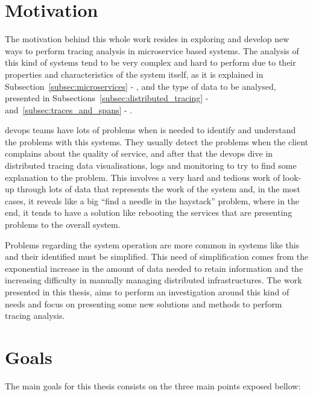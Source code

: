 \section{Motivation}
\label{sec:motivation}

The motivation behind this whole work resides in exploring and develop new ways to perform tracing analysis in microservice based systems. The analysis of this kind of systems tend to be very complex and hard to perform due to their properties and characteristics of the system itself, as it is explained in Subsection~\ref{subsec:microservices} - , and the type of data to be analysed, presented in Subsections~\ref{subsec:distributed_tracing} -  and~\ref{subsec:traces_and_spans} - .

\gls{devops} teams have lots of problems when is needed to identify and understand the problems with this systems. They usually detect the problems when the client complains about the quality of service, and after that the \gls{devops} dive in distributed tracing data visualisations, logs and monitoring to try to find some explanation to the problem. This involves a very hard and tedious work of look-up through lots of data that represents the work of the system and, in the most cases, it reveals like a big ``find a needle in the haystack'' problem, where in the end, it tends to have a solution like rebooting the services that are presenting problems to the overall system.

Problems regarding the system operation are more common in systems like this and their identified must be simplified. This need of simplification comes from the exponential increase in the amount of data needed to retain information and the increasing difficulty in manually managing distributed infrastructures. The work presented in this thesis, aims to perform an investigation around this kind of needs and focus on presenting some new solutions and methods to perform tracing analysis.

\section{Goals}
\label{sec:goals}

The main goals for this thesis consists on the three main points exposed bellow:


